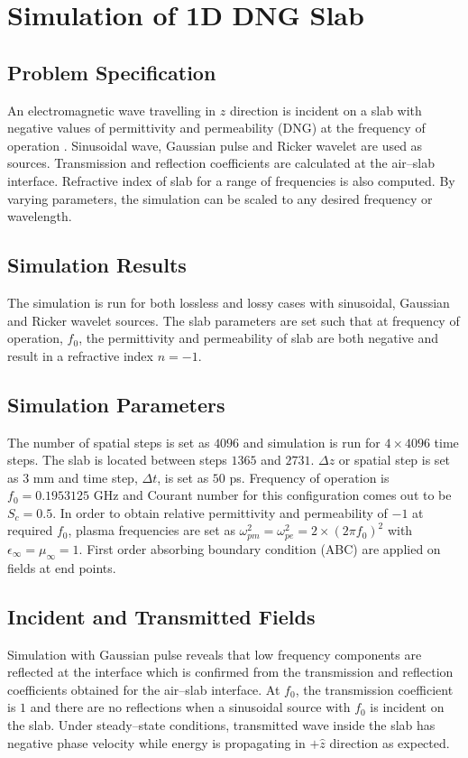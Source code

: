 \documentclass{article}
\begin{document}
\section{Simulation of 1D DNG Slab}
\subsection{Problem Specification}
An electromagnetic wave travelling in $z$ direction is incident on a slab with negative values of permittivity and permeability (DNG) at the frequency of operation \cite{DNG-Ehud-Ziol}. Sinusoidal wave, Gaussian pulse and Ricker wavelet are used as sources. Transmission and reflection coefficients are calculated at the air--slab interface. Refractive index of slab for a range of frequencies is also computed. By varying parameters, the simulation can be scaled to any desired frequency or wavelength.
\subsection{Simulation Results}
The simulation is run for both lossless and lossy cases with sinusoidal, Gaussian and Ricker wavelet sources. The slab parameters are set such that at frequency of operation, $f_0$, the permittivity and permeability of slab are both negative and result in a refractive index $n=-1$.
\subsection{Simulation Parameters}
The number of spatial steps is set as $4096$ and simulation is run for $4\times 4096$ time steps. The slab is located between steps $1365$ and $2731$. $\Delta z$ or spatial step is set as $3$ mm and time step, $\Delta t$, is set as $50$ ps. Frequency of operation is $f_0=0.1953125$ GHz and Courant number for this configuration comes out to be $S_c=0.5$. In order to obtain relative permittivity and permeability of $-1$ at required $f_0$, plasma frequencies are set as $\omega^2_{pm}=\omega^2_{pe}=2\times(2\pi f_0)^2$ with $\epsilon_\infty=\mu_\infty=1$. First order absorbing boundary condition (ABC) are applied on fields at end points.
\subsection{Incident and Transmitted Fields}
Simulation with Gaussian pulse reveals that low frequency components are reflected at the interface which is confirmed from the transmission and reflection coefficients obtained for the air--slab interface. At $f_0$, the transmission coefficient is $1$ and there are no reflections when a sinusoidal source with $f_0$ is incident on the slab. Under steady--state conditions, transmitted wave inside the slab has negative phase velocity while energy is propagating in $+\hat{z}$ direction as expected.
\end{document}
